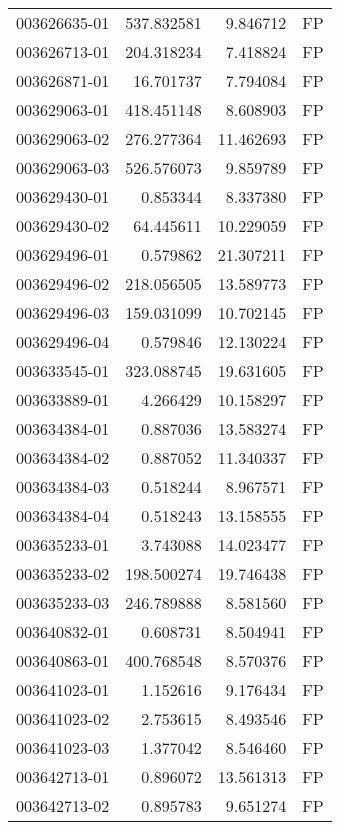 \begin{tabular}{lrrl}
003626635-01 &  537.832581 &       9.846712 &   FP \\
003626713-01 &  204.318234 &       7.418824 &   FP \\
003626871-01 &   16.701737 &       7.794084 &   FP \\
003629063-01 &  418.451148 &       8.608903 &   FP \\
003629063-02 &  276.277364 &      11.462693 &   FP \\
003629063-03 &  526.576073 &       9.859789 &   FP \\
003629430-01 &    0.853344 &       8.337380 &   FP \\
003629430-02 &   64.445611 &      10.229059 &   FP \\
003629496-01 &    0.579862 &      21.307211 &   FP \\
003629496-02 &  218.056505 &      13.589773 &   FP \\
003629496-03 &  159.031099 &      10.702145 &   FP \\
003629496-04 &    0.579846 &      12.130224 &   FP \\
003633545-01 &  323.088745 &      19.631605 &   FP \\
003633889-01 &    4.266429 &      10.158297 &   FP \\
003634384-01 &    0.887036 &      13.583274 &   FP \\
003634384-02 &    0.887052 &      11.340337 &   FP \\
003634384-03 &    0.518244 &       8.967571 &   FP \\
003634384-04 &    0.518243 &      13.158555 &   FP \\
003635233-01 &    3.743088 &      14.023477 &   FP \\
003635233-02 &  198.500274 &      19.746438 &   FP \\
003635233-03 &  246.789888 &       8.581560 &   FP \\
003640832-01 &    0.608731 &       8.504941 &   FP \\
003640863-01 &  400.768548 &       8.570376 &   FP \\
003641023-01 &    1.152616 &       9.176434 &   FP \\
003641023-02 &    2.753615 &       8.493546 &   FP \\
003641023-03 &    1.377042 &       8.546460 &   FP \\
003642713-01 &    0.896072 &      13.561313 &   FP \\
003642713-02 &    0.895783 &       9.651274 &   FP \\

\end{tabular}
